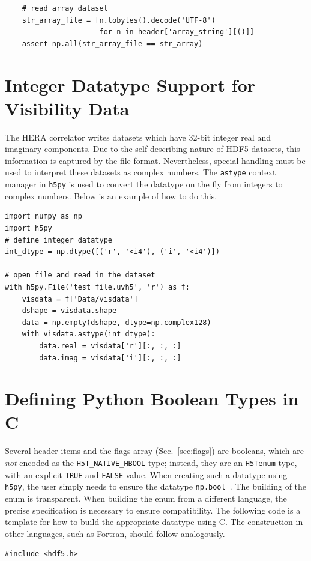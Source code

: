 \documentclass[11pt, oneside]{article}
\begin{document}
\begin{appendices}
\begin{verbatim}
    # read array dataset
    str_array_file = [n.tobytes().decode('UTF-8')
                      for n in header['array_string'][()]]
    assert np.all(str_array_file == str_array)
\end{verbatim}


\section{Integer Datatype Support for Visibility Data}
\label{appendix:integers}
The HERA correlator writes datasets which have 32-bit integer real and imaginary
components. Due to the self-describing nature of HDF5 datasets, this information
is captured by the file format. Nevertheless, special handling must be used to
interpret these datasets as complex numbers. The \verb+astype+ context manager
in \verb+h5py+ is used to convert the datatype on the fly from integers to
complex numbers. Below is an example of how to do this.

\begin{verbatim}
import numpy as np
import h5py
# define integer datatype
int_dtype = np.dtype([('r', '<i4'), ('i', '<i4')])

# open file and read in the dataset
with h5py.File('test_file.uvh5', 'r') as f:
    visdata = f['Data/visdata']
    dshape = visdata.shape
    data = np.empty(dshape, dtype=np.complex128)
    with visdata.astype(int_dtype):
        data.real = visdata['r'][:, :, :]
        data.imag = visdata['i'][:, :, :]
\end{verbatim}


\section{Defining Python Boolean Types in C}
\label{appendix:boolean}
Several header items and the flags array (Sec.~\ref{sec:flags}) are booleans, which
are \textit{not} encoded as the \texttt{H5T\_NATIVE\_HBOOL} type; instead, they are
an \texttt{H5Tenum} type, with an explicit \texttt{TRUE} and \texttt{FALSE} value.
When creating such a datatype using \verb+h5py+, the user simply needs to ensure
the datatype \verb+np.bool_+. The building of the enum is transparent. When building the enum
from a different language, the precise specification is necessary to ensure
compatibility. The following code is a template for how to build the appropriate
datatype using C. The construction in other languages, such as Fortran, should
follow analogously.
\begin{verbatim}
#include <hdf5.h>


\end{verbatim}
\end{appendices}
\end{document}
